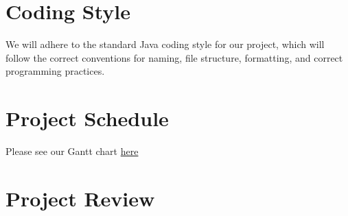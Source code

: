 \documentclass{article}
\begin{document}
\section{Coding Style}
We will adhere to the standard Java coding style for our project, which will follow the correct conventions for naming, file structure, formatting, and correct programming practices. 

\section{Project Schedule}

Please see our Gantt chart \href{https://gitlab.cas.mcmaster.ca/kowserm/3xa3/blob/master/Doc/Design/Gantt%20Chart/project_gantt.gan}{here}

\section{Project Review}
\end{document}
